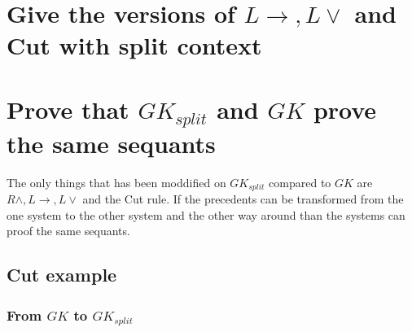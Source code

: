 \documentclass{article}
\begin{document}
\section{Give the versions of $L \to, L\vee$ and Cut with split context}
\begin{prooftree}
\end{prooftree}
\begin{prooftree}
\end{prooftree}
\begin{prooftree}
\end{prooftree}
\section{Prove that $GK_{split}$ and $GK$ prove the same sequants}
The only things that has been moddified on $GK_{split}$ compared to $GK$ are
$R\wedge, L \to, L\vee$ and the Cut rule.
If the precedents can be transformed from the one system to the other
system and the other way around than the systems can proof the same
sequants.

\subsection{Cut example}
\subsubsection{From $GK$ to $GK_{split}$}
\begin{prooftree}
\end{prooftree}

\begin{prooftree}
\end{prooftree}
\end{document}
